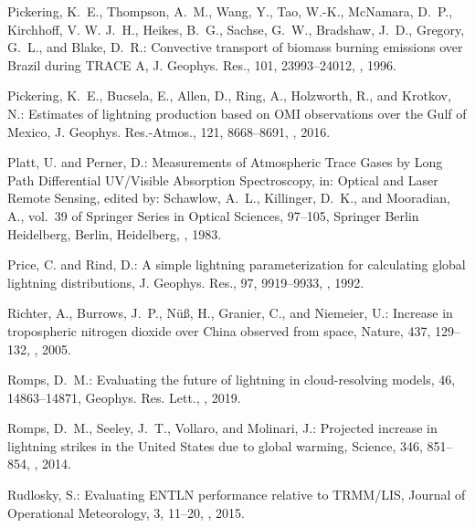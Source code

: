 \documentclass[amt]{copernicus}
\begin{document}
\begin{thebibliography}{105}
Pickering, K.~E., Thompson, A.~M., Wang, Y., Tao, W.-K., McNamara, D.~P.,
  Kirchhoff, V. W. J.~H., Heikes, B.~G., Sachse, G.~W., Bradshaw, J.~D.,
  Gregory, G.~L., and Blake, D.~R.: Convective transport of biomass burning
  emissions over Brazil during TRACE A, J. Geophys. Res., 101,
  23993--24012, , 1996.

Pickering, K.~E., Bucsela, E., Allen, D., Ring, A., Holzworth, R., and Krotkov,
  N.: Estimates of lightning  production based on OMI
   observations over the Gulf of Mexico, J. Geophys. Res.-Atmos., 121, 8668--8691,
  , 2016.

Platt, U. and Perner, D.: Measurements of Atmospheric Trace Gases by Long Path
  Differential UV/Visible Absorption Spectroscopy, in: Optical and Laser Remote
  Sensing, edited by: Schawlow, A.~L., Killinger, D.~K., and Mooradian, A.,
  vol.~39 of {Springer Series in Optical Sciences},  97--105,
  {Springer Berlin Heidelberg}, Berlin, Heidelberg,
  , 1983.

Price, C. and Rind, D.: A simple lightning parameterization for calculating
  global lightning distributions, J. Geophys. Res., 97,
  9919--9933, , 1992.

Richter, A., Burrows, J.~P., Nüß, H., Granier, C., and Niemeier, U.: Increase
  in tropospheric nitrogen dioxide over China observed from space, Nature, 437,
  129--132, , 2005.

Romps, D.~M.: Evaluating the future of lightning in cloud-resolving models,
46, 14863--14871, Geophys. Res. Lett., , 2019.

Romps, D.~M., Seeley, J.~T., Vollaro, and Molinari, J.: Projected increase in
  lightning strikes in the United States due to global warming, Science, 346, 851--854, , 2014.

Rudlosky, S.: Evaluating ENTLN performance relative to TRMM/LIS,
Journal of Operational Meteorology, 3, 11--20, , 2015.


\end{thebibliography}
\end{document}
